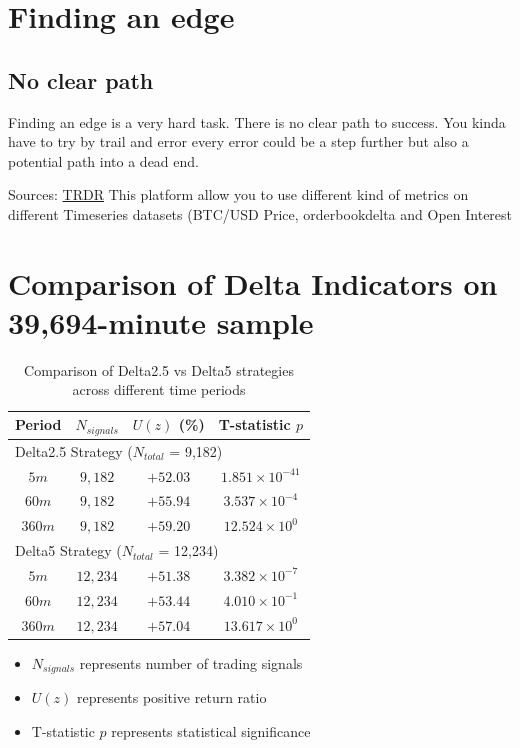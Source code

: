 \documentclass[12pt]{article}
\begin{document}
\section*{Finding an edge}
\subsection*{No clear path}
Finding an edge is a very hard task. There is no clear path to success. You kinda have to try by trail and error every error could be a step further but also a potential path into a dead end.
  

\newpage



Sources:
\href{https://trdr.io/}{TRDR} This platform allow you to use different kind of metrics on different Timeseries datasets (BTC/USD Price, orderbookdelta  and Open Interest






\newpage
\section{Comparison of Delta Indicators on 39,694-minute sample}

\begin{table}[h]
\begin{tabular}{cccc}
\hline
Period & $N_{signals}$ & $U(z)$ (\%) & T-statistic $p$ \\
\hline
\multicolumn{4}{l}{Delta2.5 Strategy ($N_{total}$ = 9,182)} \\
\hline
  $5m$ & $9,182$ & $+52.03$ & $1.851 \times 10^{-41}$ \\
  $60m$ & $9,182$ & $+55.94$ & $3.537 \times 10^{-4}$ \\
  $360m$ & $9,182$ & $+59.20$ & $12.524 \times 10^{0}$ \\
  \hline
  \multicolumn{4}{l}{Delta5 Strategy ($N_{total}$ = 12,234)} \\
  \hline
  $5m$ & $12,234$ & $+51.38$ & $3.382 \times 10^{-7}$ \\
  $60m$ & $12,234$ & $+53.44$ & $4.010 \times 10^{-1}$ \\
  $360m$ & $12,234$ & $+57.04$ & $13.617 \times 10^{0}$ \\
\hline
\end{tabular}
\caption{Comparison of Delta2.5 vs Delta5 strategies across different time periods}
\end{table}

\begin{itemize}
  \item $N_{signals}$ represents number of trading signals
  \item $U(z)$ represents positive return ratio
  \item T-statistic $p$ represents statistical significance
\end{itemize}
\end{document}
